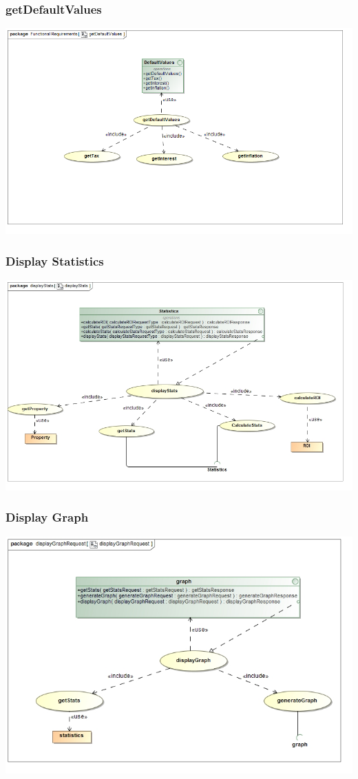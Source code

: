 \documentclass[a4paper,12pt]{article}
\begin{document}
\subsubsection{getDefaultValues}
\includegraphics[width=1\textwidth]{./Images/requiredFunctionality/getDefaultValues.png}

\subsubsection{Display Statistics}
\includegraphics[width=1\textwidth]{./Images/requiredFunctionality/displayStatsUseCase.jpg}
\subsubsection{Display Graph}
\includegraphics[width=1\textwidth]{./Images/requiredFunctionality/displayGraphRequestUseCase.jpg}
\end{document}
